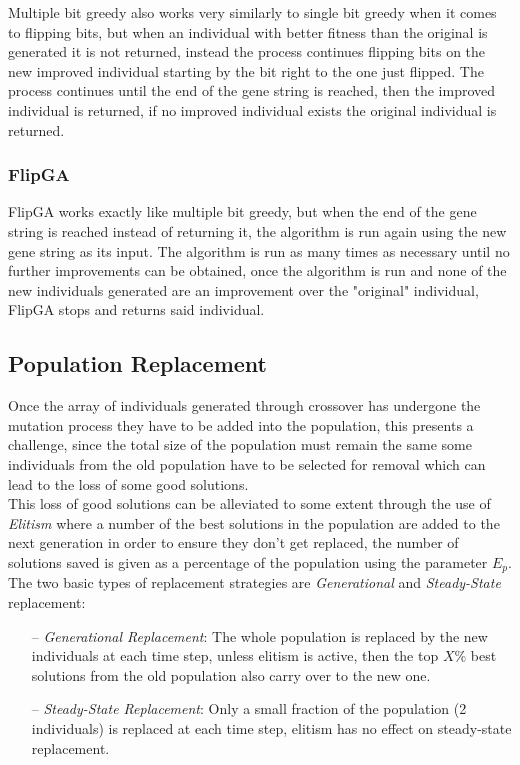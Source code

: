 	Multiple bit greedy also works very similarly to single bit greedy when it comes to flipping bits, but when an individual with better fitness than the original is generated it is not returned, instead the process continues flipping bits on the new improved individual starting by the bit right to the one just flipped. The process continues until the end of the gene string is reached, then the improved individual is returned, if no improved individual exists the original individual is returned.

	\subsubsection{FlipGA}

	FlipGA works exactly like multiple bit greedy, but when the end of the gene string is reached instead of returning it, the algorithm is run again using the new gene string as its input. The algorithm is run as many times as necessary until no further improvements can be obtained, once the algorithm is run and none of the new individuals generated are an improvement over the "original" individual, FlipGA stops and returns said individual.


\subsection{Population Replacement}
Once the array of individuals generated through crossover has undergone the mutation process they have to be added into the population, this presents a challenge, since the total size of the population must remain the same some individuals from the old population have to be selected for removal which can lead to the loss of some good solutions.
\\This loss of good solutions can be alleviated to some extent through the use of \textit{Elitism} where a number of the best solutions in the population are added to the next generation in order to ensure they don't get replaced, the number of solutions saved is given as a percentage of the population using the parameter $E_p$.
The two basic types of replacement strategies are \textit{Generational} and \textit{Steady-State} replacement:

\begin{itemize}
	\item[--] \textit{Generational Replacement}: The whole population is replaced by the new individuals at each time step, unless elitism is active, then the top $X\%$ best solutions from the old population also carry over to the new one.
	\item[--] \textit{Steady-State Replacement}: Only a small fraction of the population (2 individuals) is replaced at each time step, elitism has no effect on steady-state replacement.
\end{itemize}
 
